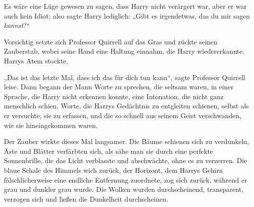 Es wäre eine Lüge gewesen zu sagen, dass Harry nicht verärgert war, aber er war auch kein Idiot; also sagte Harry lediglich: „Gibt es irgendetwas, das du mir sagen \emph{kannst}?“

Vorsichtig setzte sich Professor Quirrell auf das Gras und zückte seinen Zauberstab, wobei seine Hand eine Haltung einnahm, die Harry wiedererkannte. Harrys Atem stockte.

„Das ist das letzte Mal, dass ich das für dich tun kann“, sagte Professor Quirrell leise. Dann begann der Mann Worte zu sprechen, die seltsam waren, in einer Sprache, die Harry nicht erkennen konnte, eine Intonation, die nicht ganz menschlich schien, Worte, die Harrys Gedächtnis zu entgleiten schienen, selbst als er versuchte, sie zu erfassen, und die so schnell aus seinem Geist verschwanden, wie sie hineingekommen waren.

Der Zauber wirkte dieses Mal langsamer. Die Bäume schienen sich zu verdunkeln, Äste und Blätter verfärbten sich, als sähe man sie durch eine perfekte Sonnenbrille, die das Licht verblasste und abschwächte, ohne es zu verzerren. Die blaue Schale des Himmels wich zurück, der Horizont, dem Harrys Gehirn fälschlicherweise eine endliche Entfernung zuordnete, zog sich zurück, während er grau und dunkler grau wurde. Die Wolken wurden durchscheinend, transparent, verzogen sich und ließen die Dunkelheit durchscheinen.


